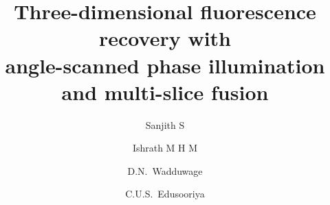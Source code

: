 \title{Three-dimensional fluorescence recovery with\\
angle-scanned phase illumination and multi-slice fusion}
\author{Sanjith S \and Ishrath M H M \and D.N.~Wadduwage \and C.U.S.~Edusooriya}
\date{}
